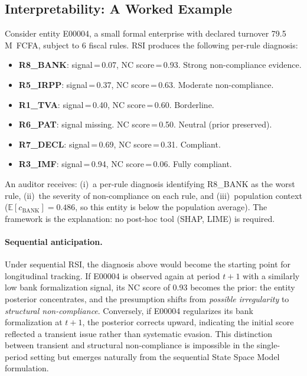 \documentclass[letterpaper]{article}
\begin{document}
\subsection{Interpretability: A Worked Example}

Consider entity E00004, a small formal enterprise with declared
turnover 79.5\,M~FCFA, subject to 6 fiscal rules. RSI produces the
following per-rule diagnosis:

\begin{itemize}[leftmargin=2em]
  \item \textbf{R8\_BANK}: signal\,=\,0.07, NC score\,=\,0.93.
        \hfill Strong non-compliance evidence.
  \item \textbf{R5\_IRPP}: signal\,=\,0.37, NC score\,=\,0.63.
        \hfill Moderate non-compliance.
  \item \textbf{R1\_TVA}: signal\,=\,0.40, NC score\,=\,0.60.
        \hfill Borderline.
  \item \textbf{R6\_PAT}: signal missing. NC score\,=\,0.50.
        \hfill Neutral (prior preserved).
  \item \textbf{R7\_DECL}: signal\,=\,0.69, NC score\,=\,0.31.
        \hfill Compliant.
  \item \textbf{R3\_IMF}: signal\,=\,0.94, NC score\,=\,0.06.
        \hfill Fully compliant.
\end{itemize}

An auditor receives: (i)~a per-rule diagnosis identifying R8\_BANK as
the worst rule, (ii)~the severity of non-compliance on each rule, and
(iii)~population context ($\mathbb{E}[c_{\mathrm{BANK}}]=0.486$, so
this entity is below the population average). The framework is the
explanation: no post-hoc tool (SHAP, LIME) is required.

\paragraph{Sequential anticipation.}
Under sequential RSI, the diagnosis above would become the starting
point for longitudinal tracking. If E00004 is observed again at period
$t{+}1$ with a similarly low bank formalization signal, its NC score
of 0.93 becomes the prior: the entity posterior concentrates, and the
presumption shifts from \emph{possible irregularity} to
\emph{structural non-compliance}. Conversely, if E00004 regularizes
its bank formalization at $t{+}1$, the posterior corrects upward,
indicating the initial score reflected a transient issue rather than
systematic evasion. This distinction between transient and structural
non-compliance is impossible in the single-period setting but emerges
naturally from the sequential State Space Model formulation.
\end{document}
